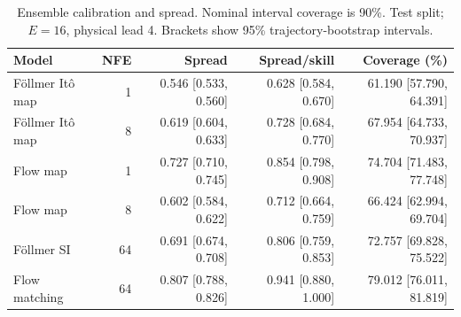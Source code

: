 \begin{table}[t]
\centering
\small
\setlength{\tabcolsep}{3pt}
\caption{Ensemble calibration and spread. Nominal interval coverage is 90\%. Test split; $E=16$, physical lead 4. Brackets show 95\% trajectory-bootstrap intervals.}
\label{tab:map-calibration}
\begin{tabular}{lrrrr}
\toprule
Model & NFE & Spread & Spread/skill & Coverage (\%) \\
\midrule
Föllmer Itô map & 1 & 0.546 [0.533, 0.560] & 0.628 [0.584, 0.670] & 61.190 [57.790, 64.391] \\
Föllmer Itô map & 8 & 0.619 [0.604, 0.633] & 0.728 [0.684, 0.770] & 67.954 [64.733, 70.937] \\
\addlinespace
Flow map & 1 & 0.727 [0.710, 0.745] & 0.854 [0.798, 0.908] & 74.704 [71.483, 77.748] \\
Flow map & 8 & 0.602 [0.584, 0.622] & 0.712 [0.664, 0.759] & 66.424 [62.994, 69.704] \\
\addlinespace
Föllmer SI & 64 & 0.691 [0.674, 0.708] & 0.806 [0.759, 0.853] & 72.757 [69.828, 75.522] \\
\addlinespace
Flow matching & 64 & 0.807 [0.788, 0.826] & 0.941 [0.880, 1.000] & 79.012 [76.011, 81.819] \\
\bottomrule
\end{tabular}
\end{table}
